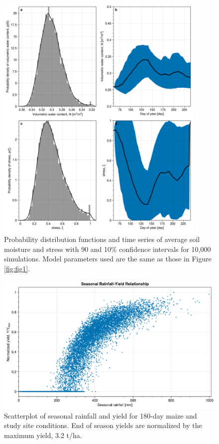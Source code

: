 \documentclass[draft]{agujournal2019}
\begin{document}
\begin{figure}%
\centering
\includegraphics[width=100mm]{fig7_PDFs.png} 
\caption{Probability distribution functions and time series of average soil moisture and stress with 90 and 10\% confidence intervals for 10,000 simulations. Model parameters used are the same as those in Figure \ref{fig:fig1}.}
\label{fig:fig2}
\end{figure}

\begin{figure}%
\centering
\includegraphics[width=120mm]{fig8_dyn-stress.png}
\caption{Scatterplot of seasonal rainfall and yield for 180-day maize and study site conditions. End of season yields are normalized by the maximum yield, 3.2 t/ha.}
\label{fig:dynstress}
\end{figure}
\end{document}
